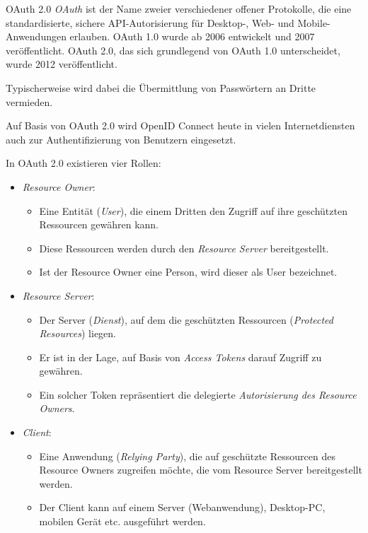 \begin{defi}{OAuth 2.0}
    \emph{OAuth} ist der Name zweier verschiedener offener Protokolle, die eine standardisierte, sichere API-Autorisierung für Desktop-, Web- und Mobile-Anwendungen erlauben.
    OAuth 1.0 wurde ab 2006 entwickelt und 2007 veröffentlicht.
    OAuth 2.0, das sich grundlegend von OAuth 1.0 unterscheidet, wurde 2012 veröffentlicht.

    Typischerweise wird dabei die Übermittlung von Passwörtern an Dritte vermieden.

    Auf Basis von OAuth 2.0 wird OpenID Connect heute in vielen Internetdiensten auch zur Authentifizierung von Benutzern eingesetzt.

    In OAuth 2.0 existieren vier Rollen:
    \begin{itemize}
        \item \emph{Resource Owner}:
              \begin{itemize}
                  \item Eine Entität (\emph{User}), die einem Dritten den Zugriff auf ihre geschützten Ressourcen gewähren kann.
                  \item Diese Ressourcen werden durch den \emph{Resource Server} bereitgestellt.
                  \item Ist der Resource Owner eine Person, wird dieser als User bezeichnet.
              \end{itemize}
        \item \emph{Resource Server}:
              \begin{itemize}
                  \item Der Server (\emph{Dienst}), auf dem die geschützten Ressourcen (\emph{Protected Resources}) liegen.
                  \item Er ist in der Lage, auf Basis von \emph{Access Tokens} darauf Zugriff zu gewähren.
                  \item Ein solcher Token repräsentiert die delegierte \emph{Autorisierung des Resource Owners}.
              \end{itemize}
        \item \emph{Client}:
              \begin{itemize}
                  \item Eine Anwendung (\emph{Relying Party}), die auf geschützte Ressourcen des Resource Owners zugreifen möchte, die vom Resource Server bereitgestellt werden.
                  \item Der Client kann auf einem Server (Webanwendung), Desktop-PC, mobilen Gerät etc. ausgeführt werden.

\end{itemize}
\end{itemize}
\end{defi}
